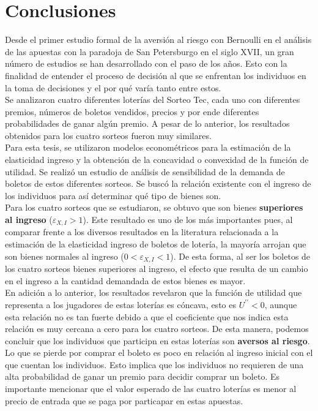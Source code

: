 \chapter*{Conclusiones}


\noindent Desde el primer estudio formal de la aversión al riesgo con Bernoulli en el análisis de las apuestas con la paradoja de San Petersburgo en el siglo XVII, un gran número de estudios se han desarrollado con el paso de los años. Esto con la finalidad de entender el proceso de decisión al que se enfrentan los individuos en la toma de decisiones y el por qué varía tanto entre estos. \\

Se analizaron cuatro diferentes loterías del Sorteo Tec, cada uno con diferentes premios, números de boletos vendidos, precios y por ende diferentes probabilidades de ganar algún premio. A pesar de lo anterior, los resultados obtenidos para los cuatro sorteos fueron muy similares. \\

Para esta tesis, se utilizaron modelos econométricos para la estimación de la elasticidad ingreso y la obtención de la concavidad o convexidad de la función de utilidad. Se realizó un estudio de análisis de sensibilidad de la demanda de boletos de estos diferentes sorteos. Se buscó la relación existente con el ingreso de los individuos para así determinar qué tipo de bienes son. \\

Para los cuatro sorteos que se estudiaron, se obtuvo que son bienes \textbf{superiores al ingreso} ($\varepsilon_{X,I} > 1$). Este resultado es uno de los más importantes pues, al comparar frente a los diversos resultados en la literatura relacionada a la estimación de la elasticidad ingreso de boletos de lotería, la mayoría arrojan que son bienes normales al ingreso ($0 < \varepsilon_{X,I} < 1$). De esta forma, al ser los boletos de los cuatro sorteos bienes superiores al ingreso, el efecto que resulta de un cambio en el ingreso a la cantidad demandada de estos bienes es mayor. \\

En adición a lo anterior, los resultados revelaron que la función de utilidad que representa a los jugadores de estas loterías es cóncava, esto es $U^{\prime \prime} < 0$, aunque esta relación no es tan fuerte debido a que el coeficiente que nos indica esta relación es muy cercana a cero para los cuatro sorteos. De esta manera, podemos concluir que los individuos que participn en estas loterías son \textbf{aversos al riesgo}. Lo que se pierde por comprar el boleto es poco en relación al ingreso inicial con el que cuentan los individuos. Esto implica que los individuos no requieren de una alta probabilidad de ganar un premio para decidir comprar un boleto. Es importante mencionar que el valor esperado de las cuatro loterías es menor al precio de entrada que se paga por particapar en estas apuestas. \\ 

